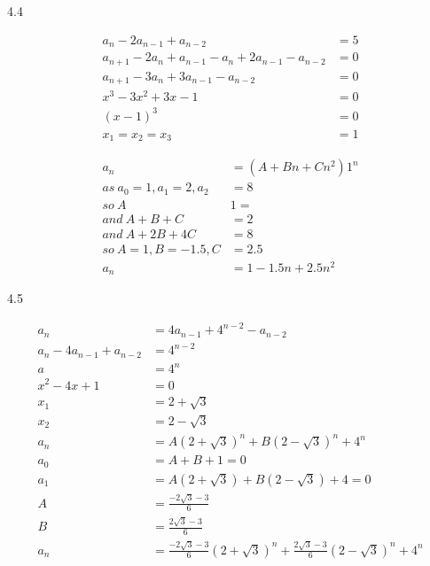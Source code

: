 \documentclass[a4paper]{article}
\begin{document}
\begin{enumerate}
\begin{solution}
\end{solution}

4.4

\begin{solution}

\begin{align}
    a_n-2a_{n-1}+a_{n-2}&=5\\
    a_{n+1}-2a_{n}+a_{n-1} - a_n+2a_{n-1}-a_{n-2}&=0\\
    a_{n+1}-3a_n+3a_{n-1}-a_{n-2} &= 0\\
    x^3-3x^2+3x-1&=0\\
    (x-1)^3&=0\\
    x_1=x_2=x_3&=1
\end{align}

\begin{align}
    a_n &= (A+Bn+Cn^2)1^n\\
    as\ a_0=1, a_1=2,a_2&=8\\
    so\ A&1=\\
    and\ A+B+C&=2\\
    and\ A+2B+4C&=8\\
    so\ A=1,B=-1.5,C&=2.5\\
    a_n &=1-1.5n+2.5n^2
\end{align}

\end{solution}

4.5

\begin{solution}

\begin{align}
    a_n &= 4a_{n-1}+4^{n-2}-a_{n-2}\\
    a_n - 4a_{n-1} + a_{n-2} &= 4^{n-2}\\
    a &= 4^n\\
    x^2-4x+1&=0\\
    x_1 &= 2+\sqrt{3}\\
    x_2 &= 2-\sqrt{3}\\
    a_n &= A(2+\sqrt{3})^n +B (2-\sqrt{3})^n+4^n\\
    a_0 &= A+B+1=0\\
    a_1 &= A(2+\sqrt{3}) +B (2-\sqrt{3})+4=0\\
    A&=\frac{-2\sqrt{3}-3}{6}\\
    B&=\frac{2\sqrt{3}-3}{6}\\
    a_n&=\frac{-2\sqrt{3}-3}{6}(2+\sqrt{3})^n +\frac{2\sqrt{3}-3}{6} (2-\sqrt{3})^n+4^n
\end{align}

\end{solution}


\end{enumerate}
\end{document}
